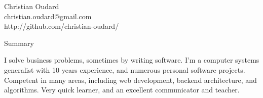 \documentclass[11pt,oneside]{article}
\begin{document}
\begin{center}
    \textrm{\Huge Christian Oudard} \\
    \vspace{4pt}
    \textsf{
        christian.oudard@gmail.com \\
        http://github.com/christian-oudard/
    }
\end{center}
\vspace{8pt} 

\textrm{\Large Summary}\par
\vspace{8pt}
\textsf{I solve business problems, sometimes by writing software. I'm a computer systems generalist with 10 years experience, and numerous personal software projects. Competent in many areas, including web development, backend architecture, and algorithms. Very quick learner, and an excellent communicator and teacher.}

\vspace{12pt}
\end{document}
